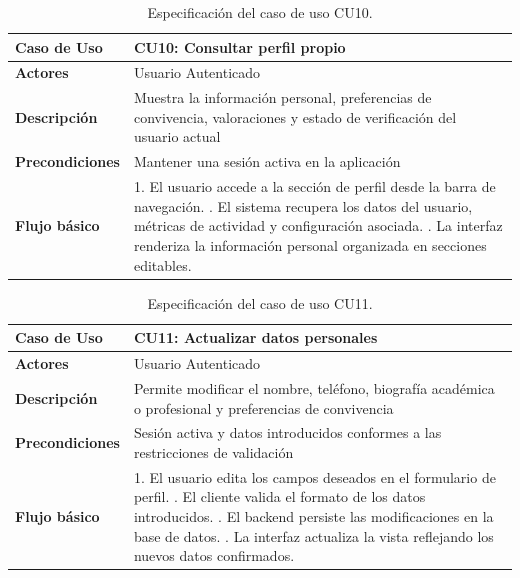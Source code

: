 \begin{table}[H]
\centering
\begin{tabular}{|p{3.1cm}|p{10.9cm}|}
\hline
\textbf{Caso de Uso} & \textbf{CU10: Consultar perfil propio} \\ \hline
\textbf{Actores} & Usuario Autenticado \\ \hline
\textbf{Descripción} & Muestra la información personal, preferencias de convivencia, valoraciones y estado de verificación del usuario actual \\ \hline
\textbf{Precondiciones} & Mantener una sesión activa en la aplicación \\ \hline
\textbf{Flujo básico} & 
1. El usuario accede a la sección de perfil desde la barra de navegación. \newline
2. El sistema recupera los datos del usuario, métricas de actividad y configuración asociada. \newline
3. La interfaz renderiza la información personal organizada en secciones editables. \\ \hline
\end{tabular}
\caption{Especificación del caso de uso CU10.}
\label{tab:cu10}
\end{table}

\begin{table}[H]
\centering
\begin{tabular}{|p{3.1cm}|p{10.9cm}|}
\hline
\textbf{Caso de Uso} & \textbf{CU11: Actualizar datos personales} \\ \hline
\textbf{Actores} & Usuario Autenticado \\ \hline
\textbf{Descripción} & Permite modificar el nombre, teléfono, biografía académica o profesional y preferencias de convivencia \\ \hline
\textbf{Precondiciones} & Sesión activa y datos introducidos conformes a las restricciones de validación \\ \hline
\textbf{Flujo básico} & 
1. El usuario edita los campos deseados en el formulario de perfil. \newline
2. El cliente valida el formato de los datos introducidos. \newline
3. El backend persiste las modificaciones en la base de datos. \newline
4. La interfaz actualiza la vista reflejando los nuevos datos confirmados. \\ \hline
\end{tabular}
\caption{Especificación del caso de uso CU11.}
\label{tab:cu11}
\end{table}

